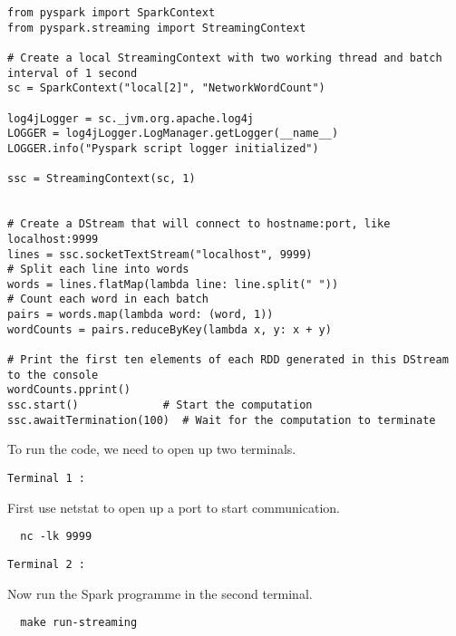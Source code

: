 \begin{lstlisting}
from pyspark import SparkContext
from pyspark.streaming import StreamingContext

# Create a local StreamingContext with two working thread and batch interval of 1 second
sc = SparkContext("local[2]", "NetworkWordCount")

log4jLogger = sc._jvm.org.apache.log4j
LOGGER = log4jLogger.LogManager.getLogger(__name__)
LOGGER.info("Pyspark script logger initialized")

ssc = StreamingContext(sc, 1)


# Create a DStream that will connect to hostname:port, like localhost:9999
lines = ssc.socketTextStream("localhost", 9999)
# Split each line into words
words = lines.flatMap(lambda line: line.split(" "))
# Count each word in each batch
pairs = words.map(lambda word: (word, 1))
wordCounts = pairs.reduceByKey(lambda x, y: x + y)

# Print the first ten elements of each RDD generated in this DStream to the console
wordCounts.pprint()
ssc.start()             # Start the computation
ssc.awaitTermination(100)  # Wait for the computation to terminate

\end{lstlisting}

To run the code, we need to open up two terminals.

\verb|Terminal 1 :|

First use netstat to open up a port to start communication.

\begin{lstlisting}
  nc -lk 9999
\end{lstlisting}


\verb|Terminal 2 :|

Now run the Spark programme in the second terminal.

\begin{lstlisting}
  make run-streaming
\end{lstlisting}